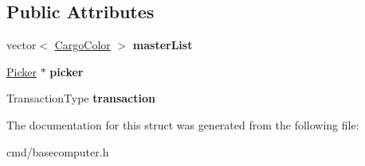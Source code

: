 \subsection*{Public Attributes}
\begin{DoxyCompactItemize}
\item 
vector$<$ \hyperlink{classCargoColor}{Cargo\+Color} $>$ {\bfseries master\+List}\hypertarget{structBaseComputer_1_1TransactionList_ad98f51206faa49b2fbf8c0e317c628af}{}\label{structBaseComputer_1_1TransactionList_ad98f51206faa49b2fbf8c0e317c628af}

\item 
\hyperlink{classPicker}{Picker} $\ast$ {\bfseries picker}\hypertarget{structBaseComputer_1_1TransactionList_aa3a23303ff1af06d0c238977a5a7d891}{}\label{structBaseComputer_1_1TransactionList_aa3a23303ff1af06d0c238977a5a7d891}

\item 
Transaction\+Type {\bfseries transaction}\hypertarget{structBaseComputer_1_1TransactionList_a5b434be76c239121236bb5846e8b05aa}{}\label{structBaseComputer_1_1TransactionList_a5b434be76c239121236bb5846e8b05aa}

\end{DoxyCompactItemize}


The documentation for this struct was generated from the following file\+:\begin{DoxyCompactItemize}
\item 
cmd/basecomputer.\+h\end{DoxyCompactItemize}
